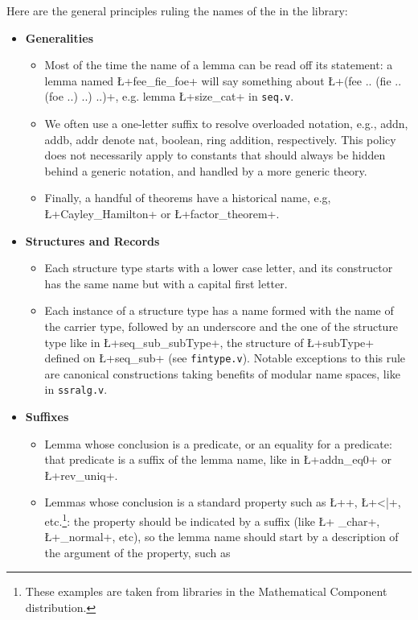 Here are the general principles ruling the names of the in the \mcbMC{} library:
\begin{itemize}
\item{\bf Generalities}
  \begin{itemize}
  \item Most of the time the name of a lemma can be read off its
    statement: a lemma named \L+fee_fie_foe+ will say something about
    \L+(fee .. (fie ..(foe ..) ..) ..)+, e.g. lemma \L+size_cat+ in
    {\tt seq.v}.
  \item We often use a one-letter suffix to resolve overloaded
    notation, e.g., addn, addb, addr denote nat, boolean, ring
    addition, respectively. This policy does not necessarily apply to
    constants that should always be hidden behind a generic notation,
    and handled by a more generic theory.
  \item Finally, a handful of theorems have a historical name,
    e.g, \L+Cayley_Hamilton+ or \L+factor_theorem+.
  \end{itemize}
\item{\bf Structures and Records}
  \begin{itemize}
  \item Each structure type starts with a
    lower case letter, and its constructor has the same name but with a
    capital first letter.
  \item Each instance of a structure type has a name formed with the
    name of the carrier type, followed by an underscore and the one of
    the structure type like in \L+seq_sub_subType+, the structure of
    \L+subType+ defined on \L+seq_sub+ (see {\tt fintype.v}). Notable
    exceptions to this rule are canonical constructions taking
    benefits of modular name spaces, like in {\tt ssralg.v}.
  \end{itemize}
\item {\bf Suffixes}
  \begin{itemize}
  \item Lemma whose conclusion is a predicate, or an equality
    for a predicate: that predicate is a suffix of the lemma name,
    like in \L+addn_eq0+ or \L+rev_uniq+.
  \item Lemmas whose conclusion is a standard property such as
    \L+\char+, \L+<|+, etc.\footnote{These examples are taken from
      libraries in the Mathematical Component distribution.}:
    the property should be
    indicated by a suffix (like \L+ _char+, \L+_normal+, etc), so
    the lemma name
    should start by a description of the argument of the property, such as

\end{itemize}
\end{itemize}

